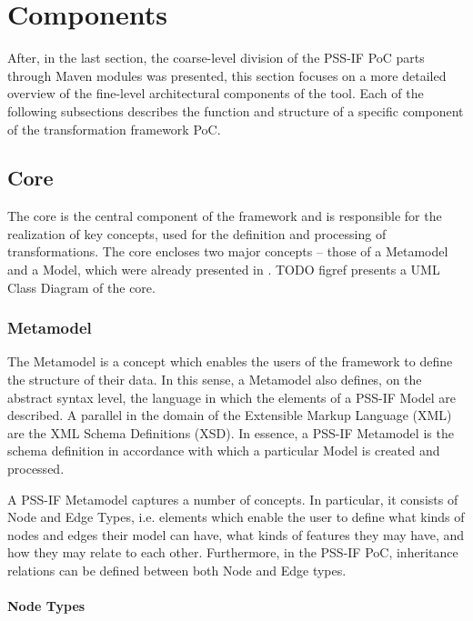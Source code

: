 \section{Components}
\label{sec:impl:components}

After, in the last section, the coarse-level division of the PSS-IF PoC parts through Maven modules was presented, this section focuses on a more detailed overview of the fine-level architectural components of the tool. Each of the following subsections describes the function and structure of a specific component of the transformation framework PoC.

\subsection{Core}

The core is the central component of the framework and is responsible for the realization of key concepts, used for the definition and processing of transformations. The core encloses two major concepts -- those of a Metamodel and a Model, which were already presented in . \color{red}TODO figref\color{black} presents a UML Class Diagram of the core.

\subsubsection{Metamodel}

The Metamodel is a concept which enables the users of the framework to define the structure of their data. In this sense, a Metamodel also defines, on the abstract syntax level, the language in which the elements of a PSS-IF Model are described. A parallel in the domain of the Extensible Markup Language (XML) are the XML Schema Definitions (XSD). In essence, a PSS-IF Metamodel is the schema definition in accordance with which a particular Model is created and processed.

A PSS-IF Metamodel captures a number of concepts. In particular, it consists of Node and Edge Types, i.e. elements which enable the user to define what kinds of nodes and edges their model can have, what kinds of features they may have, and how they may relate to each other. Furthermore, in the PSS-IF PoC, inheritance relations can be defined between both Node and Edge types.

\paragraph{Node Types}

